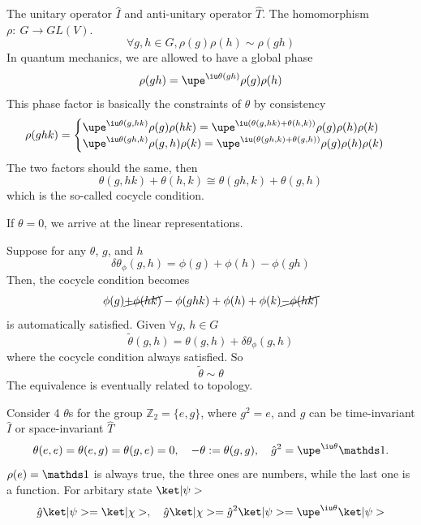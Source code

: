 The unitary operator $\hat I$ and anti-unitary operator $\hat T$.
The homomorphism $\rho:\ G \to GL(V)$.
\[
  \forall g, h \in G, \rho(g) \rho(h) \sim \rho(gh)
\]
In quantum mechanics, we are allowed to have a global phase
\[
  \rho(gh) = \upe^{\iu\theta(gh)} \rho(g) \rho(h)
\]
This phase factor is basically the constraints of $\theta$ by consistency
\[
  \rho(ghk) = \begin{cases}
    \upe^{\iu\theta(g,hk)} \rho(g) \rho(hk)
  = \upe^{\iu(\theta(g,hk) + \theta(h,k))} \rho(g) \rho(h) \rho(k)\\
    \upe^{\iu\theta(gh, k)} \rho(g,h) \rho(k)
  = \upe^{\iu(\theta(gh,k) + \theta(g,h))} \rho(g) \rho(h) \rho(k)\\
  \end{cases}
\]
The two factors should the same, then
\[
  \theta(g,hk) + \theta(h,k) \cong \theta(gh,k) + \theta(g,h)
\]
which is the so-called cocycle condition.
\begin{enumext}
  \item If $\theta = 0$, we arrive at the linear representations.
  \item Suppose for any $\theta$, $g$, and $h$
  \[
    \delta \theta_\phi(g,h) = \phi(g) + \phi(h) - \phi(gh)
  \]
  Then, the cocycle condition becomes
  \[
    \phi(g) \cancel{+ \phi(hk)} - \phi(ghk) + \phi(h) + \phi(k)
    \cancel{-\phi(hk)}
  \]
  is automatically satisfied. Given $\forall g$, $h \in G$
  \[
    \tilde\theta(g,h) = \theta(g,h) + \delta \theta_\phi(g,h)
  \]
  where the cocycle condition always satisfied. So
  \[
    \tilde \theta \sim \theta
  \]
  The equivalence is eventually related to topology.
\end{enumext}
Consider 4 $\theta$s for the group $\mathbb Z_2 = \{e, g\}$, where $g^2 = e$,
and $g$ can be time-invariant $\hat I$ or space-invariant $\hat T$
\[
  \theta(e,e) = \theta(e,g) = \theta(g,e) = 0,\quad
  -\theta := \theta(g,g), \quad
  \hat g^2 = \upe^{\iu\theta} \identity.
\]
$\rho(e) = \identity$ is always true, the three ones are numbers, while the last
one is a function. For arbitary state $\ket|\psi>$
\[
  \hat g \ket|\psi> = \ket|\chi>, \quad
  \hat g \ket|\chi> = \hat g^2 \ket|\psi> = \upe^{\iu\theta} \ket|\psi>
\]
